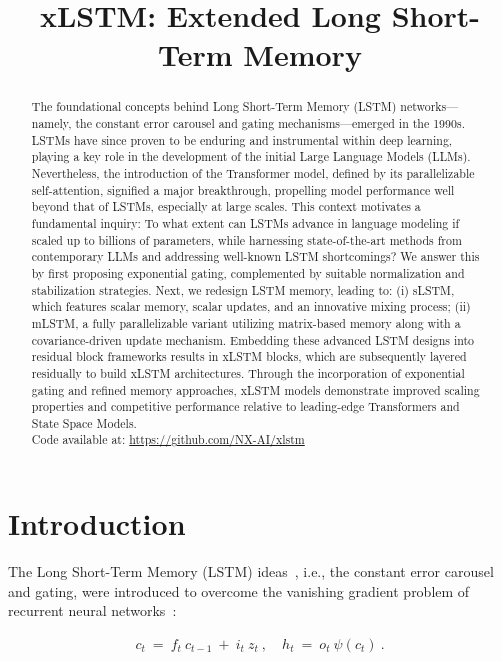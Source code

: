 \title{xLSTM: Extended Long Short-Term Memory}

\begin{abstract}
The foundational concepts behind Long Short-Term Memory (LSTM) networks—namely, the constant error carousel and gating mechanisms—emerged in the 1990s. LSTMs have since proven to be enduring and instrumental within deep learning, playing a key role in the development of the initial Large Language Models (LLMs). Nevertheless, the introduction of the Transformer model, defined by its parallelizable self-attention, signified a major breakthrough, propelling model performance well beyond that of LSTMs, especially at large scales. This context motivates a fundamental inquiry: To what extent can LSTMs advance in language modeling if scaled up to billions of parameters, while harnessing state-of-the-art methods from contemporary LLMs and addressing well-known LSTM shortcomings? We answer this by first proposing exponential gating, complemented by suitable normalization and stabilization strategies. Next, we redesign LSTM memory, leading to: (i) sLSTM, which features scalar memory, scalar updates, and an innovative mixing process; (ii) mLSTM, a fully parallelizable variant utilizing matrix-based memory along with a covariance-driven update mechanism. Embedding these advanced LSTM designs into residual block frameworks results in xLSTM blocks, which are subsequently layered residually to build xLSTM architectures. Through the incorporation of exponential gating and refined memory approaches, xLSTM models demonstrate improved scaling properties and competitive performance relative to leading-edge Transformers and State Space Models.\\
Code available at: \url{https://github.com/NX-AI/xlstm}
\end{abstract}

\section{Introduction}
\label{sec:intro}

The Long Short-Term Memory (LSTM) ideas~\citep{Hochreiter:91,Hochreiter:97nips,Hochreiter:97}, i.e., the constant error carousel and gating, were introduced to overcome the vanishing gradient problem of recurrent neural networks~\citep{Hochreiter:91,Hochreiter:00book}:

\begin{align}
\label{eq:lstm_idea}
  c_t \ = \ f_t \ c_{t-1} \ + \ 
          i_t \  z_t \ , \quad  
          h_t \ = \ o_t \ \psi({c_t}) \ . 
\end{align}

